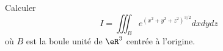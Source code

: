 
\begin{exercice}\label{exoOutilsMath-0094}

Calculer
\begin{equation}
    I=\iiint_B e^{(x^2+y^2+z^2)^{3/2}}dxdydz
\end{equation}
où $B$ est la boule unité de $\eR^3$ centrée à l'origine.

\end{exercice}
